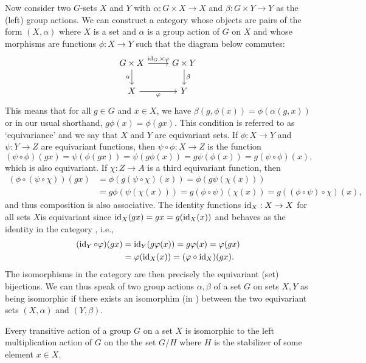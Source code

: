 Now consider two \(G\)-sets \(X\) and \(Y\) with \(\alpha : G \times X \to X\)
and \(\beta : G \times Y \to Y\) as the (left) group actions. We can construct a
category {\Gset} whose objects are pairs of the form \((X, \alpha)\) where \(X\)
is a set and \(\alpha\) is a group action of \(G\) on \(X\) and whose morphisms
are functions \(\phi: X \to Y\) such that the diagram below commutes:
\[
    \begin{tikzcd}
        G \times X \arrow[d, "\alpha"'] \arrow[r, "\id_G \times \phi"] & G\times Y \arrow[d, "\beta"] \\
        X \arrow[r, "\phi"']                                           & Y                           
    \end{tikzcd}
\]
This means that for all \(g \in G\) and \(x \in X\), we have \(\beta(g, \phi(x))
= \phi(\alpha(g, x))\) or in our usual shorthand, \(g\phi(x) = \phi(gx)\). This
condition is referred to as `equivariance' and we say that \(X\) and \(Y\) are
equivariant sets. If \(\phi: X \to Y\) and \(\psi: Y \to Z\) are equivariant
functions, then \(\psi \circ \phi: X \to Z\) is the function
\[
    (\psi \circ \phi)(gx) = \psi(\phi(gx)) = \psi(g\phi(x)) = g\psi(\phi(x)) = g(\psi \circ \phi)(x),
\]
which is also equivariant. If \(\chi: Z \to A\) is a third equivariant function,
then
\begin{align*}
    (\phi \circ (\psi \circ \chi))(gx) &= \phi(g(\psi \circ \chi)(x)) = \phi(g\psi(\chi(x)))\\
    &= g\phi(\psi(\chi(x))) = g(\phi \circ \psi)(\chi(x)) = g((\phi \circ \psi) \circ \chi)(x),
\end{align*}
and thus composition is also associative. The identity functions \(\operatorname{id}_X: X \to
X\) for all sets \(X\)is equivariant since \(\operatorname{id}_X(gx) = gx = g(\operatorname{id}_X(x))\) and
behaves as the identity in the category \Gset, i.e.,
\begin{align*}
    (\operatorname{id}_Y \circ \varphi)(gx) &= \operatorname{id}_Y(g\varphi(x)) = g\varphi(x) = \varphi(gx) \\
    &= \varphi(\operatorname{id}_X(x)) = (\varphi \circ \operatorname{id}_X)(gx).
\end{align*}
The isomorphisms in the category {\Gset} are then precisely the equivariant
(set) bijections. We can thus speak of two group actions \(\alpha, \beta\) of a
set \(G\) on sets \(X, Y\) as being isomorphic if there exists an isomorphim (in
\Gset) between the two equivariant sets \((X, \alpha)\) and \((Y, \beta)\).

\begin{theorem}
    \label{thm:orbit-stabilizer}
    Every transitive action of a group \(G\) on a set \(X\) is isomorphic to the
    left multiplication action of \(G\) on the the set \(G/H\) where \(H\) is
    the stabilizer of some element \(x \in X\).
\end{theorem}

